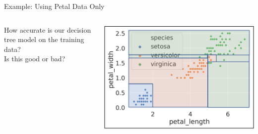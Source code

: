 \documentclass[aspectratio=169]{../latex_main/tntbeamer}  %
\begin{document}
	
	\begin{frame}{Example: Using Petal Data Only}
	   \begin{columns}
	        \begin{column}{.5\textwidth}
	               How accurate is our decision tree model on the training data?\\
	               \bigskip
	                Is this good or bad?
	        \end{column}
	   
	   
	         \begin{column}{.5\textwidth}

	                     \includegraphics[scale=.34]{figure_tree/Bild16}

	        \end{column}
	   \end{columns}
	 \end{frame}
	 
\end{document}
